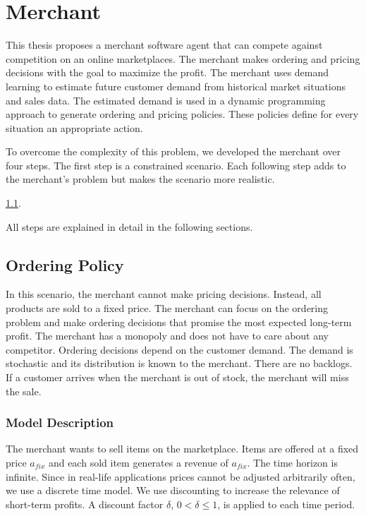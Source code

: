 \chapter{Merchant}
This thesis proposes a merchant software agent that can compete against competition on an online marketplaces.
The merchant makes ordering and pricing decisions with the goal to maximize the profit.
The merchant uses demand learning to estimate future customer demand from historical market situations and sales data.
The estimated demand is used in a dynamic programming approach to generate ordering and pricing policies.
These policies define for every situation an appropriate action.

To overcome the complexity of this problem, we developed the merchant over four steps.
The first step is a constrained scenario.
Each following step adds to the merchant's problem but makes the scenario more realistic.

 \cref{section:ordering_policy}.

All steps are explained in detail in the following sections.

\section{Ordering Policy}
\label{section:ordering_policy}
In this scenario, the merchant cannot make pricing decisions.
Instead, all products are sold to a fixed price.
The merchant can focus on the ordering problem and make ordering decisions that promise the most expected long-term profit.
The merchant has a monopoly and does not have to care about any competitor.
Ordering decisions depend on the customer demand.
The demand is stochastic and its distribution is known to the merchant.
There are no backlogs. %
If a customer arrives when the merchant is out of stock, the merchant will miss the sale.

\subsection{Model Description}
The merchant wants to sell items on the marketplace.
Items are offered at a fixed price $a_{fix}$ and each sold item generates a revenue of $a_{fix}$.
The time horizon is infinite.
Since in real-life applications prices cannot be adjusted arbitrarily often, we use a discrete time
model.
We use discounting to increase the relevance of short-term profits.
A discount factor $\delta$, $0 < \delta \leq 1$, is applied to each time period.

